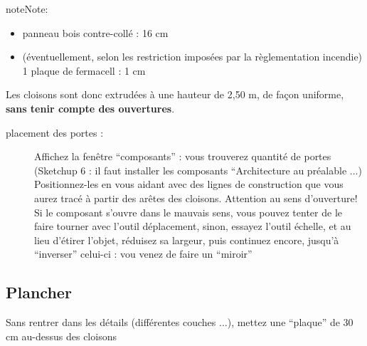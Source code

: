 \documentclass[a4paper,12pt,french]{sphinxmanual}
\begin{document}
\begin{notice}{note}{Note:}
\begin{description}
\begin{itemize}
\begin{description}
\begin{itemize}
\begin{description}
\begin{itemize}
\end{itemize}

\end{description}

\item {} 
panneau bois contre-collé : 16 cm

\item {} 
(éventuellement, selon les restriction imposées par la règlementation incendie)  1 plaque de fermacell : 1 cm

\end{itemize}

\end{description}

\end{itemize}

\end{description}
\end{notice}

Les cloisons sont donc extrudées à une hauteur de 2,50 m, de façon uniforme, \textbf{sans tenir compte des ouvertures}.
\begin{description}
\item[{placement des portes :}] \leavevmode
Affichez la fenêtre ``composants'' : vous trouverez quantité de portes (Sketchup 6 : il faut installer les composants ``Architecture au préalable ...)
Positionnez-les en vous aidant avec des lignes de construction que vous aurez tracé à partir des arêtes des cloisons.
Attention au sens d'ouverture! Si le composant s'ouvre dans le mauvais sens, vous pouvez tenter de le faire tourner avec l'outil déplacement, sinon, essayez l'outil échelle, et au lieu d'étirer l'objet, réduisez sa largeur, puis continuez encore, jusqu'à ``inverser'' celui-ci : vou venez de faire un ``miroir''

\end{description}


\subsection{Plancher}
\label{init_su+acad/003_su1:plancher}
Sans rentrer dans les détails (différentes couches ...), mettez une ``plaque'' de 30 cm au-dessus des cloisons
\end{document}
